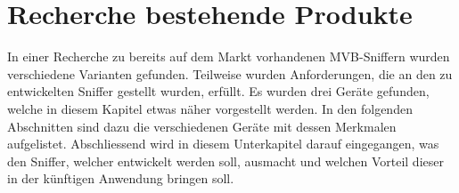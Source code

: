 \section{Recherche bestehende Produkte}
\label{sec:recherche}

In einer Recherche zu bereits auf dem Markt vorhandenen MVB-Sniffern wurden verschiedene Varianten
gefunden. Teilweise wurden Anforderungen, die an den zu entwickelten Sniffer gestellt wurden, erfüllt.
Es wurden drei Geräte gefunden, welche in diesem Kapitel etwas näher vorgestellt werden. In den folgenden Abschnitten sind dazu die verschiedenen Geräte mit dessen Merkmalen aufgelistet. Abschliessend wird in diesem Unterkapitel darauf eingegangen, was den Sniffer, welcher entwickelt werden soll, ausmacht und welchen Vorteil dieser in der künftigen Anwendung bringen soll.

